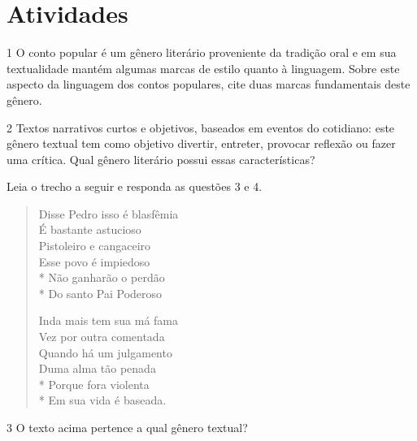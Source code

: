 \section{Atividades}

\num{1} O conto popular é um gênero literário proveniente da tradição oral e
em sua textualidade mantém algumas marcas de estilo quanto à linguagem. Sobre
este aspecto da linguagem dos contos populares, cite duas marcas fundamentais
deste gênero.


\num{2} Textos narrativos curtos e objetivos, baseados em eventos do
cotidiano: este gênero textual tem como objetivo divertir, entreter, provocar
reflexão ou fazer uma crítica. Qual gênero literário possui essas
características?


Leia o trecho a seguir e responda as questões 3 e 4.

\begin{verse}

Disse Pedro isso é blasfêmia \\
É bastante astucioso \\
Pistoleiro e cangaceiro \\ 
Esse povo é impiedoso \\*
Não ganharão o perdão \\*
Do santo Pai Poderoso 

Inda mais tem sua má fama \\
Vez por outra comentada \\
Quando há um julgamento \\
Duma alma tão penada \\*
Porque fora violenta \\*
Em sua vida é baseada. 

\end{verse}


\num{3} O texto acima pertence a qual gênero textual?


